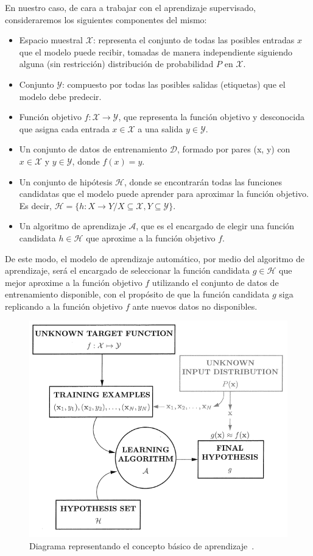 En nuestro caso, de cara a trabajar con el aprendizaje supervisado, consideraremos los siguientes componentes del mismo:
\begin{itemize}
    \item Espacio muestral $\mathcal{X}$: representa el conjunto de todas las posibles entradas $x$ que el modelo puede recibir, tomadas de manera independiente siguiendo alguna (sin restricción) distribución de probabilidad $P$ en $\mathcal{X}$.
    \item Conjunto $\mathcal{Y}$: compuesto por todas las posibles salidas (etiquetas) que el modelo debe predecir.
    \item Función objetivo $f: \mathcal{X} \rightarrow \mathcal{Y}$, que representa la función objetivo y desconocida que asigna cada entrada $x \in \mathcal{X}$ a una salida $y \in \mathcal{Y}$.
    \item Un conjunto de datos de entrenamiento $\mathcal{D}$, formado por pares (x, y) con $x \in \mathcal{X}$ y $y \in \mathcal{Y}$, donde $f(x) = y$.
    \item Un conjunto de hipótesis $\mathcal{H}$, donde se encontrarán todas las funciones candidatas que el modelo puede aprender para aproximar la función objetivo. Es decir, $\mathcal{H} = \{h: X \rightarrow Y / X \subseteq \mathcal{X}, Y \subseteq \mathcal{Y}\}$. 
    \item Un algoritmo de aprendizaje $\mathcal{A}$, que es el encargado de elegir una función candidata $h \in \mathcal{H}$ que aproxime a la función objetivo $f$.\newline
\end{itemize}

De este modo, el modelo de aprendizaje automático, por medio del algoritmo de aprendizaje, será el encargado de seleccionar la función candidata $g \in \mathcal{H}$ que mejor aproxime a la función objetivo $f$ utilizando el conjunto de datos de entrenamiento disponible, con el propósito de que la función candidata $g$ siga replicando a la función objetivo $f$ ante nuevos datos no disponibles.\newline

\begin{figure}[h]
    \centering
    \includegraphics[width=0.7\linewidth]{img/learning-diagram.png}
    \caption[Diagrama representando el concepto básico de aprendizaje.]{Diagrama representando el concepto básico de aprendizaje~\cite{Mostafa2012}.}\label{fig:learning-diagram}
\end{figure}

